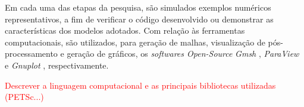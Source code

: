 \documentclass[Tese.tex]{subfiles}
\begin{document}
Em cada uma das etapas da pesquisa, são simulados exemplos numéricos representativos, a fim de verificar o código desenvolvido ou demonstrar as características dos modelos adotados. Com relação às ferramentas computacionais, são utilizados, para geração de malhas, visualização de pós-processamento e geração de gráficos, os \textit{softwares Open-Source} \textit{Gmsh} \cite{geu09}, \textit{ParaView} \cite{Paraview} e \textit{Gnuplot} \cite{gnuplot}, respectivamente.

\textcolor{red}{Descrever a linguagem computacional e as principais bibliotecas utilizadas (PETSc...)}
\end{document}
